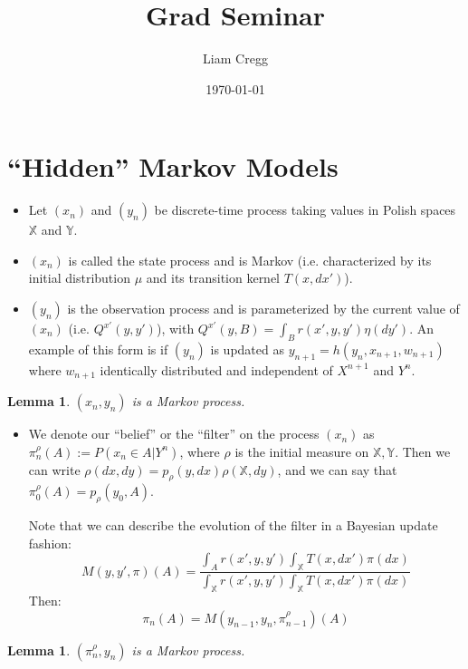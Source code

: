 \documentclass{article}
\title{Grad Seminar}
\date{\today}
\author{Liam Cregg}
\newtheorem{lemma}[theorem]{Lemma}
\begin{document}
\begin{titlepage}
    \maketitle
\end{titlepage}

\newpage

\section{``Hidden'' Markov Models}
\begin{itemize}
    \item Let \((x_n)\) and \((y_n)\) be discrete-time process taking values in Polish spaces \(\mathbb{X}\) and \(\mathbb{Y}\).
    \item \((x_n)\) is called the state process and is Markov (i.e. characterized by its initial distribution \(\mu\) and its transition kernel \(T(x,dx')\)).
    \item \((y_n)\) is the observation process and is parameterized by the current value of \((x_n)\) (i.e. \(Q^{x'}(y,y')\)), with \(Q^{x'}(y,B) = \int_B r(x',y,y')\eta(dy')\). An example of this form is if \((y_n)\) is updated as \(y_{n+1} = h(y_n,x_{n+1},w_{n+1})\) where \(w_{n+1}\) identically distributed and independent of \(X^{n+1}\) and \(Y^n\).
\end{itemize}

\begin{lemma}
    \((x_n,y_n)\) is a Markov process.
\end{lemma}

\begin{itemize}
    \item We denote our ``belief'' or the ``filter'' on the process \((x_n)\) as \(\pi^\rho_n(A) := P(x_n \in A | Y^n)\), where \(\rho\) is the initial measure on \(\mathbb{X},\mathbb{Y}\). Then we can write \(\rho(dx,dy) = p_\rho(y,dx)\rho(\mathbb{X},dy)\), and we can say that \(\pi_0^\rho(A) = p_\rho(y_0,A)\).

          Note that we can describe the evolution of the filter in a Bayesian update fashion:
          \[M(y,y',\pi)(A) = \frac{\int_A r(x',y,y')\int_\mathbb{X}T(x,dx')\pi(dx)}{\int_\mathbb{X} r(x',y,y')\int_\mathbb{X}T(x,dx')\pi(dx)}\]
          Then:
          \[ \pi_{n}(A) = M(y_{n-1},y_n,\pi_{n-1}^\rho)(A)\]
\end{itemize}

\begin{lemma}
    \((\pi^\rho_n, y_n)\) is a Markov process.
\end{lemma}
\end{document}
